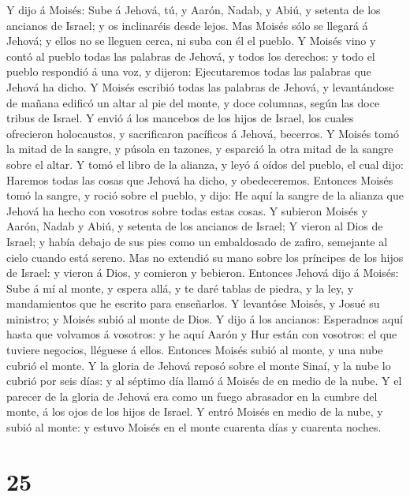  Y dijo á Moisés: Sube á Jehová, tú, y Aarón, Nadab, y Abiú,
y setenta de los ancianos de Israel; y os inclinaréis desde lejos.
 Mas Moisés sólo se llegará á Jehová; y ellos no se lleguen
cerca, ni suba con él el pueblo.  Y Moisés vino y contó al
pueblo todas las palabras de Jehová, y todos los derechos: y todo el
pueblo respondió á una voz, y dijeron: Ejecutaremos todas las palabras
que Jehová ha dicho.  Y Moisés escribió todas las palabras
de Jehová, y levantándose de mañana edificó un altar al pie del monte, y
doce columnas, según las doce tribus de Israel.  Y envió á
los mancebos de los hijos de Israel, los cuales ofrecieron holocaustos,
y sacrificaron pacíficos á Jehová, becerros.  Y Moisés tomó
la mitad de la sangre, y púsola en tazones, y esparció la otra mitad de
la sangre sobre el altar.  Y tomó el libro de la alianza, y
leyó á oídos del pueblo, el cual dijo: Haremos todas las cosas que
Jehová ha dicho, y obedeceremos.  Entonces Moisés tomó la
sangre, y roció sobre el pueblo, y dijo: He aquí la sangre de la alianza
que Jehová ha hecho con vosotros sobre todas estas cosas.  Y
subieron Moisés y Aarón, Nadab y Abiú, y setenta de los ancianos de
Israel;  Y vieron al Dios de Israel; y había debajo de sus
pies como un embaldosado de zafiro, semejante al cielo cuando está
sereno.  Mas no extendió su mano sobre los príncipes de los
hijos de Israel: y vieron á Dios, y comieron y bebieron. 
Entonces Jehová dijo á Moisés: Sube á mí al monte, y espera allá, y te
daré tablas de piedra, y la ley, y mandamientos que he escrito para
enseñarlos.  Y levantóse Moisés, y Josué su ministro; y
Moisés subió al monte de Dios.  Y dijo á los ancianos:
Esperadnos aquí hasta que volvamos á vosotros: y he aquí Aarón y Hur
están con vosotros: el que tuviere negocios, lléguese á ellos.
 Entonces Moisés subió al monte, y una nube cubrió el
monte.  Y la gloria de Jehová reposó sobre el monte Sinaí,
y la nube lo cubrió por seis días: y al séptimo día llamó á Moisés de en
medio de la nube.  Y el parecer de la gloria de Jehová era
como un fuego abrasador en la cumbre del monte, á los ojos de los hijos
de Israel.  Y entró Moisés en medio de la nube, y subió al
monte: y estuvo Moisés en el monte cuarenta días y cuarenta noches.

\hypertarget{section-24}{%
\section{25}\label{section-24}}

